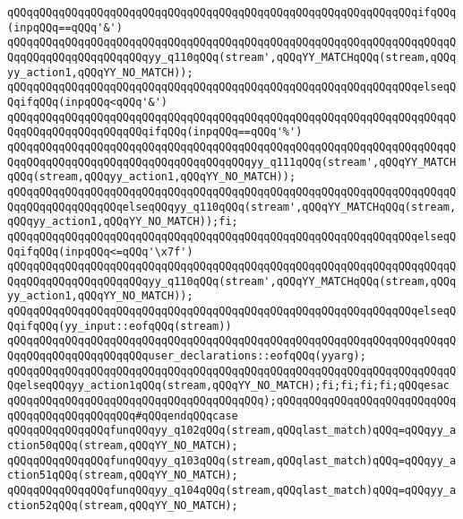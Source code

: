 \verb|qQQqqQQqqQQqqQQqqQQqqQQqqQQqqQQqqQQqqQQqqQQqqQQqqQQqqQQqqQQqqQQqifqQQq(inpqQQq==qQQq'&')|\newline
\verb|qQQqqQQqqQQqqQQqqQQqqQQqqQQqqQQqqQQqqQQqqQQqqQQqqQQqqQQqqQQqqQQqqQQqqQQqqQQqqQQqqQQqqQQqqQQqyy_q110qQQq(stream',qQQqYY_MATCHqQQq(stream,qQQqyy_action1,qQQqYY_NO_MATCH));|\newline
\verb|qQQqqQQqqQQqqQQqqQQqqQQqqQQqqQQqqQQqqQQqqQQqqQQqqQQqqQQqqQQqqQQqelseqQQqifqQQq(inpqQQq<qQQq'&')|\newline
\verb|qQQqqQQqqQQqqQQqqQQqqQQqqQQqqQQqqQQqqQQqqQQqqQQqqQQqqQQqqQQqqQQqqQQqqQQqqQQqqQQqqQQqqQQqqQQqifqQQq(inpqQQq==qQQq'%')|\newline
\verb|qQQqqQQqqQQqqQQqqQQqqQQqqQQqqQQqqQQqqQQqqQQqqQQqqQQqqQQqqQQqqQQqqQQqqQQqqQQqqQQqqQQqqQQqqQQqqQQqqQQqqQQqqQQqyy_q111qQQq(stream',qQQqYY_MATCHqQQq(stream,qQQqyy_action1,qQQqYY_NO_MATCH));|\newline
\verb|qQQqqQQqqQQqqQQqqQQqqQQqqQQqqQQqqQQqqQQqqQQqqQQqqQQqqQQqqQQqqQQqqQQqqQQqqQQqqQQqqQQqqQQqelseqQQqyy_q110qQQq(stream',qQQqYY_MATCHqQQq(stream,qQQqyy_action1,qQQqYY_NO_MATCH));fi;|\newline
\verb|qQQqqQQqqQQqqQQqqQQqqQQqqQQqqQQqqQQqqQQqqQQqqQQqqQQqqQQqqQQqqQQqelseqQQqifqQQq(inpqQQq<=qQQq'\x7f')|\newline
\verb|qQQqqQQqqQQqqQQqqQQqqQQqqQQqqQQqqQQqqQQqqQQqqQQqqQQqqQQqqQQqqQQqqQQqqQQqqQQqqQQqqQQqqQQqqQQqyy_q110qQQq(stream',qQQqYY_MATCHqQQq(stream,qQQqyy_action1,qQQqYY_NO_MATCH));|\newline
\verb|qQQqqQQqqQQqqQQqqQQqqQQqqQQqqQQqqQQqqQQqqQQqqQQqqQQqqQQqqQQqqQQqelseqQQqifqQQq(yy_input::eofqQQq(stream))|\newline
\verb|qQQqqQQqqQQqqQQqqQQqqQQqqQQqqQQqqQQqqQQqqQQqqQQqqQQqqQQqqQQqqQQqqQQqqQQqqQQqqQQqqQQqqQQqqQQquser_declarations::eofqQQq(yyarg);|\newline
\verb|qQQqqQQqqQQqqQQqqQQqqQQqqQQqqQQqqQQqqQQqqQQqqQQqqQQqqQQqqQQqqQQqqQQqqQQqelseqQQqyy_action1qQQq(stream,qQQqYY_NO_MATCH);fi;fi;fi;fi;qQQqesac|\newline
\verb|qQQqqQQqqQQqqQQqqQQqqQQqqQQqqQQqqQQqqQQq);qQQqqQQqqQQqqQQqqQQqqQQqqQQqqQQqqQQqqQQqqQQqqQQq#qQQqendqQQqcase|\newline
\verb|qQQqqQQqqQQqqQQqfunqQQqyy_q102qQQq(stream,qQQqlast_match)qQQq=qQQqyy_action50qQQq(stream,qQQqYY_NO_MATCH);|\newline
\verb|qQQqqQQqqQQqqQQqfunqQQqyy_q103qQQq(stream,qQQqlast_match)qQQq=qQQqyy_action51qQQq(stream,qQQqYY_NO_MATCH);|\newline
\verb|qQQqqQQqqQQqqQQqfunqQQqyy_q104qQQq(stream,qQQqlast_match)qQQq=qQQqyy_action52qQQq(stream,qQQqYY_NO_MATCH);|\newline
